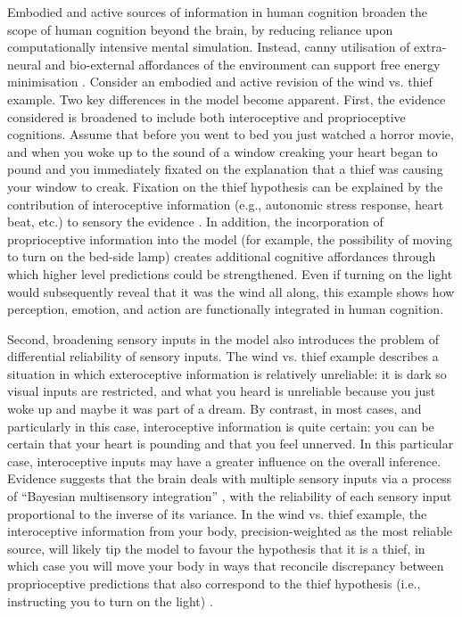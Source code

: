 \begin{CJK}{UTF8}{gbsn}
Embodied and active sources of information in human cognition broaden the scope of human cognition beyond the brain, by reducing reliance upon computationally intensive mental simulation.  Instead, canny utilisation of extra-neural and bio-external affordances of the environment can support free energy minimisation \citep{Clark2015}.  Consider an embodied and active revision of the wind vs. thief example.  Two key differences in the model become apparent.  First, the evidence considered is broadened to include both interoceptive and proprioceptive cognitions.  Assume that before you went to bed you just watched a horror movie, and when you woke up to the sound of a window creaking your heart began to pound and you immediately fixated on the explanation that a thief was causing your window to creak.  Fixation on the thief hypothesis can be explained by the contribution of interoceptive information (e.g., autonomic stress response, heart beat, etc.) to sensory the evidence \citep{Pezzulo2014}.  In addition, the incorporation of proprioceptive information into the model (for example, the possibility of moving to turn on the bed-side lamp) creates additional cognitive affordances through which higher level predictions could be strengthened.  Even if turning on the light would subsequently reveal that it was the wind all along, this example shows how perception, emotion, and action are functionally integrated in human cognition.

Second, broadening sensory inputs in the model also introduces the problem of differential reliability of sensory inputs.  The wind vs. thief example describes a situation in which exteroceptive information is relatively unreliable: it is dark so visual inputs are restricted, and what you heard is unreliable because you just woke up and maybe it was part of a dream.  By contrast, in most cases, and particularly in this case, interoceptive information is quite certain: you can be certain that your heart is pounding and that you feel unnerved.  In this particular case, interoceptive inputs may have a greater influence on the overall inference.  Evidence suggests that the brain deals with multiple sensory inputs via a process of ``Bayesian multisensory integration'' \citep{Ernst2004}, with the reliability of each sensory input proportional to the inverse of its variance.  In the wind vs. thief example, the interoceptive information from your body, precision-weighted as the most reliable source, will likely tip the model to favour the hypothesis that it is a thief, in which case you will move your body in ways that reconcile discrepancy between proprioceptive predictions that also correspond to the thief hypothesis (i.e., instructing you to turn on the light) \citep{Pezzulo2014}.


\end{CJK}
